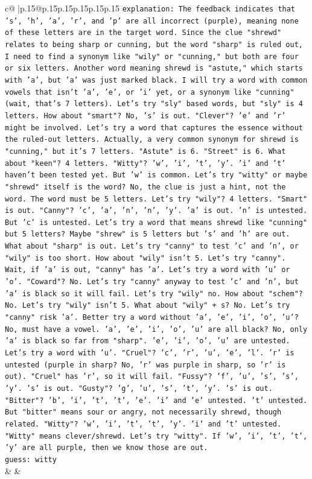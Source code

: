 \documentclass{article}
\begin{document}
{\begin{supertabular}{c@{$\;$}|p{.15\linewidth}@{}p{.15\linewidth}p{.15\linewidth}p{.15\linewidth}p{.15\linewidth}p{.15\linewidth}}
{{{                \texttt{explanation: The feedback indicates that 's', 'h', 'a', 'r', and 'p' are all incorrect (purple), meaning none of these letters are in the target word. Since the clue "shrewd" relates to being sharp or cunning, but the word "sharp" is ruled out, I need to find a synonym like "wily" or "cunning," but both are four or six letters. Another word meaning shrewd is "astute," which starts with 'a', but 'a' was just marked black. I will try a word with common vowels that isn't 'a', 'e', or 'i' yet, or a synonym like "cunning" (wait, that's 7 letters). Let's try "sly" based words, but "sly" is 4 letters. How about "smart"? No, 's' is out. "Clever"? 'e' and 'r' might be involved. Let's try a word that captures the essence without the ruled{-}out letters. Actually, a very common synonym for shrewd is "cunning," but it's 7 letters. "Astute" is 6. "Street" is 6. What about "keen"? 4 letters. "Witty"? 'w', 'i', 't', 'y'. 'i' and 't' haven't been tested yet. But 'w' is common. Let's try "witty" or maybe "shrewd" itself is the word? No, the clue is just a hint, not the word. The word must be 5 letters. Let's try "wily"? 4 letters. "Smart" is out. "Canny"? 'c', 'a', 'n', 'n', 'y'. 'a' is out. 'n' is untested. But 'c' is untested. Let's try a word that means shrewd like "cunning" but 5 letters? Maybe "shrew" is 5 letters but 's' and 'h' are out. What about "sharp" is out. Let's try "canny" to test 'c' and 'n', or "wily" is too short. How about "wily" isn't 5. Let's try "canny". Wait, if 'a' is out, "canny" has 'a'. Let's try a word with 'u' or 'o'. "Coward"? No. Let's try "canny" anyway to test 'c' and 'n', but 'a' is black so it will fail. Let's try "wily" no. How about "schem"? No. Let's try "wily" isn't 5. What about "wily" + s? No. Let's try "canny" risk 'a'. Better try a word without 'a', 'e', 'i', 'o', 'u'? No, must have a vowel. 'a', 'e', 'i', 'o', 'u' are all black? No, only 'a' is black so far from "sharp". 'e', 'i', 'o', 'u' are untested. Let's try a word with 'u'. "Cruel"? 'c', 'r', 'u', 'e', 'l'. 'r' is untested (purple in sharp? No, 'r' was purple in sharp, so 'r' is out). "Cruel" has 'r', so it will fail. "Fussy"? 'f', 'u', 's', 's', 'y'. 's' is out. "Gusty"? 'g', 'u', 's', 't', 'y'. 's' is out. "Bitter"? 'b', 'i', 't', 't', 'e'. 'i' and 'e' untested. 't' untested. But "bitter" means sour or angry, not necessarily shrewd, though related. "Witty"? 'w', 'i', 't', 't', 'y'. 'i' and 't' untested. "Witty" means clever/shrewd. Let's try "witty". If 'w', 'i', 't', 't', 'y' are all purple, then we know those are out.} \\
\texttt{guess: witty} \\
            }
        }
    }
    & & \\ \\


\end{supertabular}}
\end{document}
